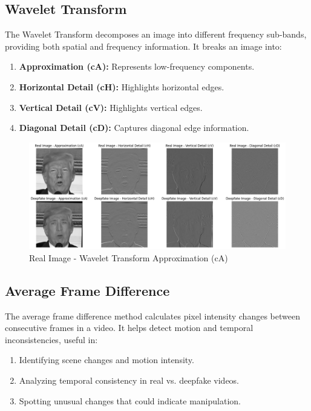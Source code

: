 \documentclass{article}
\begin{document}
\subsection{Wavelet Transform}
The Wavelet Transform decomposes an image into different frequency sub-bands, providing both spatial and frequency information. It breaks an image into:
\begin{enumerate}
    \item \textbf{Approximation (cA):} Represents low-frequency components.
    \item \textbf{Horizontal Detail (cH):} Highlights horizontal edges.
    \item \textbf{Vertical Detail (cV):} Highlights vertical edges.
    \item \textbf{Diagonal Detail (cD):} Captures diagonal edge information.
\end{enumerate}

\begin{figure}[h!]
    \centering
    \includegraphics[width=1\textwidth]{real_wavelet_cA.png}
    \caption{Real Image - Wavelet Transform Approximation (cA)}
    \label{fig:real_wavelet_cA}
\end{figure}

\subsection{Average Frame Difference}
The average frame difference method calculates pixel intensity changes between consecutive frames in a video. It helps detect motion and temporal inconsistencies, useful in:
\begin{enumerate}
    \item Identifying scene changes and motion intensity.
    \item Analyzing temporal consistency in real vs. deepfake videos.
    \item Spotting unusual changes that could indicate manipulation.
\end{enumerate}
\end{document}
